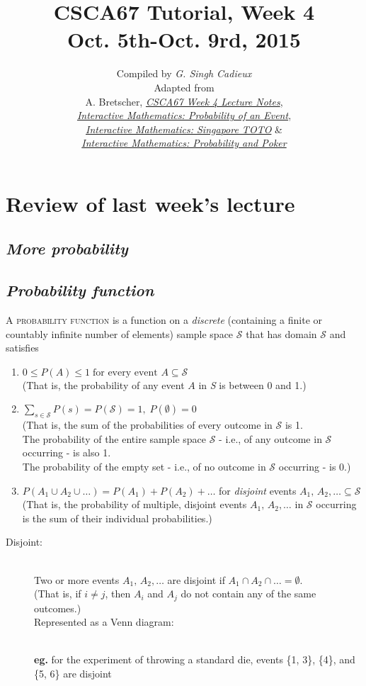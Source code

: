 \documentclass{article}
\title{\sc\LARGE CSCA67 Tutorial, Week 4\\
{\Large Oct. 5th-Oct. 9rd, 2015}}
\date{}
\author{\sc Compiled by {\em G. Singh Cadieux}\\[1ex]
\sc Adapted from\\
A. Bretscher, \href{http://www.utsc.utoronto.ca/~bretscher/a67/lectures/w4.pdf}{\em CSCA67 Week 4 Lecture Notes},\\
\href{http://www.intmath.com/counting-probability/6-probability-event.php}{\em Interactive Mathematics: Probability of an Event},\\
\href{http://www.intmath.com/counting-probability/singapore-toto.php}{\em Interactive Mathematics: Singapore TOTO} \&\\
\href{http://www.intmath.com/counting-probability/poker.php}{\em Interactive Mathematics: Probability and Poker}}
\begin{document}
\maketitle

\section{\sc Review of last week's lecture}
\subsection*{\em More probability}

\subsection{\em Probability function}
A \textsc{probability function} is a function on a \textit{discrete} (containing a finite or countably infinite number of elements) sample space $\mathcal{S}$ that has domain $\mathcal{S}$ and satisfies
\begin{enumerate}
\item $0\leq P(A)\leq 1\;\text{for every event }A\subseteq\mathcal{S}$\\[1ex]
(That is, the probability of any event $A$ in \textsl{S} is between 0 and 1.)
\item $\sum\limits_{s\in \mathcal{S}}P(s)=P(\mathcal{S})=1,\;P(\emptyset)=0$\\[1ex]
(That is, the sum of the probabilities of every outcome in $\mathcal{S}$ is 1.\\
The probability of the entire sample space $\mathcal{S}$ - i.e., of any outcome in $\mathcal{S}$ occurring - is also 1.\\
The probability of the empty set - i.e., of no outcome in $\mathcal{S}$ occurring - is 0.)
\item $P(A_1\cup A_2\cup\ldots)=P(A_1)+P(A_2)+\ldots$ for \textit{disjoint} events $A_1,\,A_2,\ldots\subseteq \mathcal{S}$\\[1ex]
(That is, the probability of multiple, disjoint events $A_1,\,A_2,\ldots$ in $\mathcal{S}$ occurring is the sum of their individual probabilities.)
\end{enumerate}
\begin{description}
\item[\sc Disjoint:]\hfill\\
Two or more events $A_1,\,A_2,\ldots$ are disjoint if $A_1\cap A_2\cap\ldots=\emptyset$.\\[1ex]
(That is, if $i\neq j$, then $A_i$ and $A_j$ do not contain any of the same outcomes.)\\[1ex]
Represented as a Venn diagram:\\
\\[1ex]
\textbf{eg.} for the experiment of throwing a standard die, events \{1, 3\}, \{4\}, and \{5, 6\} are disjoint
\end{description}
\end{document}
